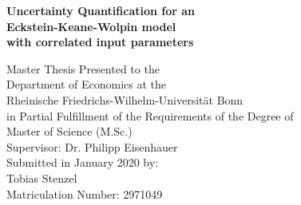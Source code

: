 \begin{titlepage}
	
\begin{center}
	
\vspace*{1.0cm}

{\LARGE
\bfseries Uncertainty Quantification for an \\
\vspace*{0.5cm}
Eckstein-Keane-Wolpin model
}
\\
\vspace*{0.5cm}
{\LARGE
\bfseries with correlated input parameters
}

{\large
\vspace*{4.0cm}
Master Thesis Presented to the\\
\vspace*{0.25cm}
Department of Economics at the\\
\vspace*{0.25cm}
Rheinische Friedrichs-Wilhelm-Universität Bonn\\

\vspace*{2.0cm}
in Partial Fulfillment of the Requirements of the Degree of\\
\vspace*{0.25cm}
Master of Science (M.Sc.)\\

\vspace*{4.0cm}
Supervisor: Dr. Philipp Eisenhauer\\

\vspace*{2.0cm}
Submitted in January 2020 by:\\
Tobias Stenzel\\
Matriculation Number: 2971049
}

\end{center}

\end{titlepage}